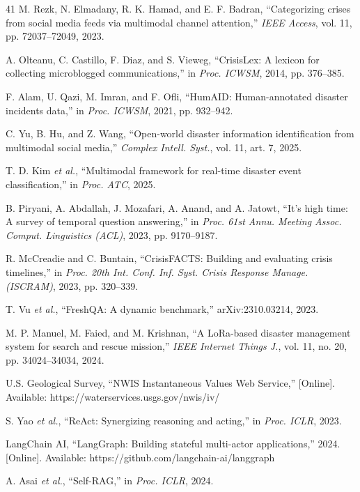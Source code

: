\documentclass[conference]{IEEEtran}
\begin{document}
\begin{thebibliography}{41}
 M. Rezk, N. Elmadany, R. K. Hamad, and E. F. Badran, ``Categorizing crises from social media feeds via multimodal channel attention,'' \textit{IEEE Access}, vol. 11, pp. 72037--72049, 2023.

 A. Olteanu, C. Castillo, F. Diaz, and S. Vieweg, ``CrisisLex: A lexicon for collecting microblogged communications,'' in \textit{Proc. ICWSM}, 2014, pp. 376--385.

 F. Alam, U. Qazi, M. Imran, and F. Ofli, ``HumAID: Human-annotated disaster incidents data,'' in \textit{Proc. ICWSM}, 2021, pp. 932--942.

 C. Yu, B. Hu, and Z. Wang, ``Open-world disaster information identification from multimodal social media,'' \textit{Complex Intell. Syst.}, vol. 11, art. 7, 2025.

 T. D. Kim \textit{et al.}, ``Multimodal framework for real-time disaster event classification,'' in \textit{Proc. ATC}, 2025.

 B. Piryani, A. Abdallah, J. Mozafari, A. Anand, and A. Jatowt, ``It's high time: A survey of temporal question answering,'' in \textit{Proc. 61st Annu. Meeting Assoc. Comput. Linguistics (ACL)}, 2023, pp. 9170--9187.

 R. McCreadie and C. Buntain, ``CrisisFACTS: Building and evaluating crisis timelines,'' in \textit{Proc. 20th Int. Conf. Inf. Syst. Crisis Response Manage. (ISCRAM)}, 2023, pp. 320--339.

 T. Vu \textit{et al.}, ``FreshQA: A dynamic benchmark,'' arXiv:2310.03214, 2023.

 M. P. Manuel, M. Faied, and M. Krishnan, ``A LoRa-based disaster management system for search and rescue mission,'' \textit{IEEE Internet Things J.}, vol. 11, no. 20, pp. 34024--34034, 2024.

 U.S. Geological Survey, ``NWIS Instantaneous Values Web Service,'' [Online]. Available: https://waterservices.usgs.gov/nwis/iv/

 S. Yao \textit{et al.}, ``ReAct: Synergizing reasoning and acting,'' in \textit{Proc. ICLR}, 2023.

 LangChain AI, ``LangGraph: Building stateful multi-actor applications,'' 2024. [Online]. Available: https://github.com/langchain-ai/langgraph

 A. Asai \textit{et al.}, ``Self-RAG,'' in \textit{Proc. ICLR}, 2024.


\end{thebibliography}
\end{document}
